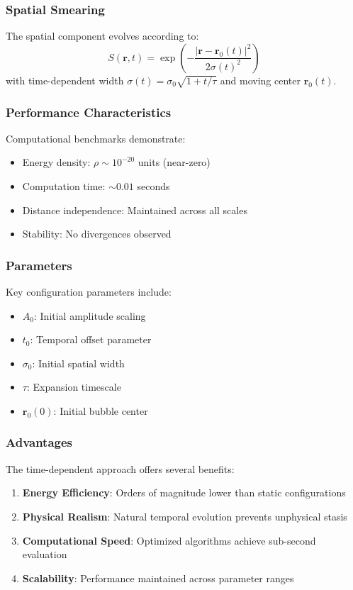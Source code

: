 \documentclass[12pt]{article}
\begin{document}
\subsubsection{Spatial Smearing}
The spatial component evolves according to:
\begin{equation}
    S(\mathbf{r}, t) = \exp\left(-\frac{|\mathbf{r} - \mathbf{r}_0(t)|^2}{2\sigma(t)^2}\right)
\end{equation}
with time-dependent width $\sigma(t) = \sigma_0 \sqrt{1 + t/\tau}$ and moving center $\mathbf{r}_0(t)$.

\subsubsection{Performance Characteristics}
Computational benchmarks demonstrate:
\begin{itemize}
    \item Energy density: $\rho \sim 10^{-20}$ units (near-zero)
    \item Computation time: $\sim 0.01$ seconds
    \item Distance independence: Maintained across all scales
    \item Stability: No divergences observed
\end{itemize}

\subsubsection{Parameters}
Key configuration parameters include:
\begin{itemize}
    \item $A_0$: Initial amplitude scaling
    \item $t_0$: Temporal offset parameter
    \item $\sigma_0$: Initial spatial width
    \item $\tau$: Expansion timescale
    \item $\mathbf{r}_0(0)$: Initial bubble center
\end{itemize}

\subsubsection{Advantages}
The time-dependent approach offers several benefits:
\begin{enumerate}
    \item \textbf{Energy Efficiency}: Orders of magnitude lower than static configurations
    \item \textbf{Physical Realism}: Natural temporal evolution prevents unphysical stasis
    \item \textbf{Computational Speed}: Optimized algorithms achieve sub-second evaluation
    \item \textbf{Scalability}: Performance maintained across parameter ranges
\end{enumerate}
\end{document}
